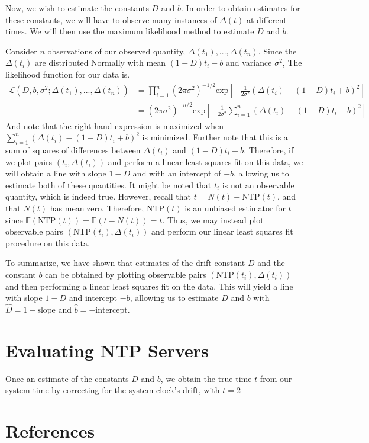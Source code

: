 \documentclass[letterpaper, 11pt]{article}
\begin{document}
Now, we wish to estimate the constants $D$ and $b$. In order to obtain estimates for these
constants, we will have to observe many instances of $\Delta(t)$ at different times. We will
then use the maximum likelihood method to estimate $D$ and $b$.

Consider $n$ observations of our observed quantity, $\Delta(t_1), ..., \Delta(t_n)$.
Since the $\Delta(t_i)$ are distributed Normally with mean $(1-D)t_i - b$
and variance $\sigma^2$,
The likelihood function for our data is.
\begin{align}
    \mathcal{L}(D, b, \sigma^2; \Delta(t_1),..., \Delta(t_n)) &= \prod_{i=1}^n
    (2\pi \sigma^2)^{-1/2} \text{exp}[- \frac{1}{2\sigma^2} (\Delta(t_i)
    - (1-D)t_i +b)^2] \\
    &=  (2\pi \sigma^2)^{-n/2} \text{exp}[- \frac{1}{2\sigma^2} \sum_{i=1}^n 
    (\Delta(t_i) - (1-D)t_i + b)^2 ]
\end{align}
And note that the right-hand expression is maximized when
$\sum_{i=1}^n 
(\Delta(t_i) - (1-D)t_i + b)^2$
is minimized. Further note that this is a sum of squares of differences between
$\Delta(t_i)$ and $(1-D)t_i - b$. Therefore, if we plot pairs $(t_i, \Delta(t_i))$ and
perform a linear least squares fit on this data, we will obtain a line with slope $1-D$ and 
with an intercept of $-b$, allowing us to estimate both of these quantities. It might be noted that $t_i$ is not an observable quantity, which
is indeed true. However, recall that $t = N(t) + \text{NTP}(t)$, and that $N(t)$ has mean zero.
Therefore, $\text{NTP}(t)$ is an unbiased estimator for $t$ since
$\mathbb{E}(\text{NTP}(t)) = \mathbb{E}(t - N(t)) = t$. Thus, we may instead plot observable
pairs $(\text{NTP}(t_i), \Delta(t_i))$ and perform our linear least squares fit procedure on this
data.

To summarize, we have shown that estimates of the drift constant $D$ and the constant $b$
can be obtained by plotting observable pairs $(\text{NTP}(t_i), \Delta(t_i))$ and then
performing a linear least squares fit on the data. This will yield a line with slope $1-D$ and
intercept $-b$, allowing us to estimate $D$ and $b$ with $\hat{D} = 1 - \text{slope}$ and
$\hat{b} = - \text{intercept}$.



\section{Evaluating NTP Servers}
Once an estimate of the constants $D$ and $b$, we obtain the true time $t$ from our system
time by correcting for the system clock's drift, with $t = 2$




\pagebreak

\section{References}



\end{document}
